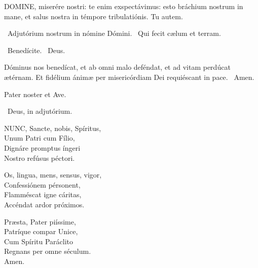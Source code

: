


\lettrine[lines=2]{D}{OMINE}, miserére nostri: te enim exspectávimus: esto bráchium nostrum in mane, et salus nostra in témpore tribulatiónis. Tu autem.




\V\ Adjutórium nostrum in nómine Dómini. \R\ Qui fecit cælum et terram.

\V\ Benedícite. \R\ Deus.

 Dóminus nos benedícat, et ab omni malo deféndat, et ad vitam perdúcat ætérnam. Et fidélium ánimæ per misericórdiam Dei requiéscant in pace. \R\ Amen.


\sectionornament
\label{p:20}


Pater noster et Ave.

\V\ Deus, in adjutórium.


\lettrine[lines=2]{N}{UNC}, Sancte, nobis, Spíritus,\\
Unum Patri cum Fílio,\\
Dignáre promptus íngeri\\
Nostro refúsus péctori.

Os, lingua, mens, sensus, vigor,\\
Confessiónem pérsonent,\\
Flamméscat igne cáritas,\\
Accéndat ardor próximos.

Præsta, Pater piíssime,\\
Patríque compar Unice,\\
Cum Spíritu Paráclito\\
Regnans per omne séculum.\\
Amen.

